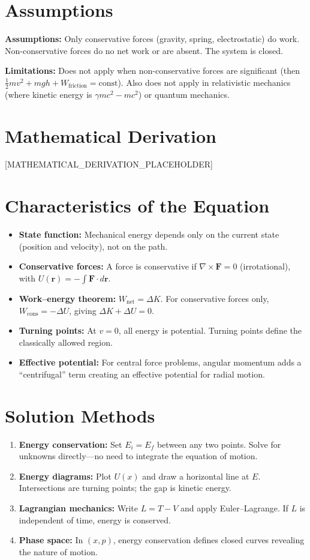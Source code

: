 \documentclass[11pt,openright]{book}
\begin{document}
\section*{Assumptions}

\textbf{Assumptions:} Only conservative forces (gravity, spring, electrostatic) do work. Non-conservative forces do no net work or are absent. The system is closed.


\textbf{Limitations:} Does not apply when non-conservative forces are significant (then $\frac{1}{2}mv^2 + mgh + W_{\text{friction}} = \text{const}$). Also does not apply in relativistic mechanics (where kinetic energy is $\gamma mc^2 - mc^2$) or quantum mechanics.


\section*{Mathematical Derivation}

[MATHEMATICAL_DERIVATION_PLACEHOLDER]

\section*{Characteristics of the Equation}

\begin{itemize}
\item \textbf{State function:} Mechanical energy depends only on the current state (position and velocity), not on the path.
\item \textbf{Conservative forces:} A force is conservative if $\nabla \times \mathbf{F} = 0$ (irrotational), with $U(\mathbf{r}) = -\int \mathbf{F} \cdot d\mathbf{r}$.
\item \textbf{Work--energy theorem:} $W_{\text{net}} = \Delta K$. For conservative forces only, $W_{\text{cons}} = -\Delta U$, giving $\Delta K + \Delta U = 0$.
\item \textbf{Turning points:} At $v = 0$, all energy is potential. Turning points define the classically allowed region.
\item \textbf{Effective potential:} For central force problems, angular momentum adds a ``centrifugal'' term creating an effective potential for radial motion.
\end{itemize}
\section*{Solution Methods}

\begin{enumerate}
\item \textbf{Energy conservation:} Set $E_i = E_f$ between any two points. Solve for unknowns directly---no need to integrate the equation of motion.
\item \textbf{Energy diagrams:} Plot $U(x)$ and draw a horizontal line at $E$. Intersections are turning points; the gap is kinetic energy.
\item \textbf{Lagrangian mechanics:} Write $L = T - V$ and apply Euler--Lagrange. If $L$ is independent of time, energy is conserved.
\item \textbf{Phase space:} In $(x, p)$, energy conservation defines closed curves revealing the nature of motion.
\end{enumerate}
\end{document}
